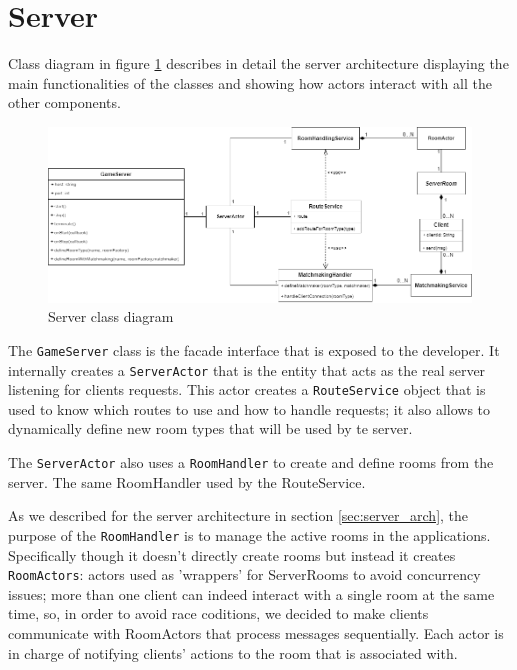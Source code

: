 \section{Server}
Class diagram in figure \ref{fig:server_class_diagram} describes in detail the server architecture displaying the main functionalities of the classes and showing how actors interact with all the other components. 
\begin{figure}[h]
	\hspace*{-1.1in}
	\includegraphics[scale=0.55]{images/4-design/server_class.png}
	\caption{Server class diagram}
	\label{fig:server_class_diagram}
\end{figure}

The \texttt{GameServer} class is the facade interface that is exposed to the developer. It internally creates a \texttt{ServerActor} that is the entity that acts as the real server listening for clients requests. This actor creates a \texttt{RouteService} object that is used to know which routes to use and how to handle requests; it also allows to dynamically define new room types that will be used by te server. 

The \texttt{ServerActor} also uses a \texttt{RoomHandler} to create and define rooms from the server. The same RoomHandler used by the RouteService.

As we described for the server architecture in section \ref{sec:server_arch}, the purpose of the \texttt{RoomHandler} is to manage the active rooms in the applications. Specifically though it doesn't directly create rooms but instead it creates \texttt{RoomActors}: actors used as 'wrappers' for ServerRooms to avoid concurrency issues; more than one client can indeed interact with a single room at the same time, so, in order to avoid race coditions, we decided to make clients communicate with RoomActors that process messages sequentially. Each actor is in charge of notifying clients' actions to the room that is associated with.

